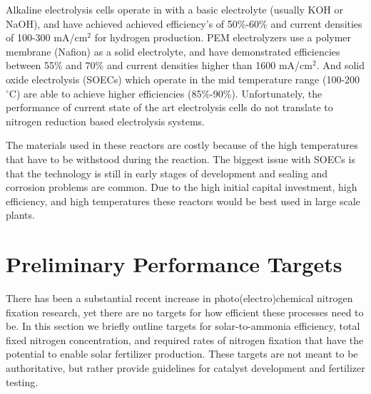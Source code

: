 Alkaline electrolysis cells operate in with a basic electrolyte (usually KOH or NaOH), and have achieved achieved efficiency's of 50\%-60\% and current densities of 100-300 mA/cm$^2$ for hydrogen production. PEM electrolyzers use a polymer membrane (Nafion) as a solid electrolyte, and have demonstrated efficiencies between 55\% and 70\% and current densities higher than 1600 mA/cm$^2$. And solid oxide electrolysis (SOECs) which operate in the mid temperature range (100-200 $^\circ$C) are able to achieve higher efficiencies (85\%-90\%). Unfortunately, the performance of current state of the art electrolysis cells do not translate to nitrogen reduction based electrolysis systems. 

The materials used in these reactors are costly because of the high temperatures that have to be withstood during the reaction. The biggest issue with SOECs is that the technology is still in early stages of development and sealing and corrosion problems are common. Due to the high initial capital investment, high efficiency, and high temperatures these reactors would be best used in large scale plants. 

\section{Preliminary Performance Targets}
\label{sec:targets}

There has been a substantial recent increase in photo(electro)chemical nitrogen fixation research, yet there are no targets for how efficient these processes need to be. In this section we briefly outline targets for solar-to-ammonia efficiency, total fixed nitrogen concentration, and required rates of nitrogen fixation that have the potential to enable solar fertilizer production. These targets are not meant to be authoritative, but rather provide guidelines for catalyst development and fertilizer testing. 

